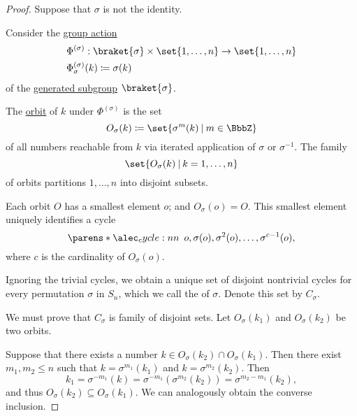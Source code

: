 \begin{proof}
  Suppose that \( \sigma \) is not the identity.

  Consider the \hyperref[def:group_action]{group action}
  \begin{equation*}
    \begin{aligned}
      &\Phi^{(\sigma)}: \braket{ \sigma } \times \set{ 1, \ldots, n } \to \set{ 1, \ldots, n } \\
      &\Phi^{(\sigma)}_\sigma(k) \coloneqq \sigma(k)
    \end{aligned}
  \end{equation*}
  of the \hyperref[def:first_order_generated_substructure]{generated subgroup} \( \braket{ \sigma } \).

  The \hyperref[def:group_action_orbit]{orbit} of \( k \) under \( \Phi^{(\sigma)} \) is the set
  \begin{equation*}
    O_\sigma(k) \coloneqq \set{ \sigma^m(k) \given m \in \BbbZ }
  \end{equation*}
  of all numbers reachable from \( k \) via iterated application of \( \sigma \) or \( \sigma^{-1} \). The family
  \begin{equation*}
    \set{ O_\sigma(k) \given k = 1, \ldots, n }
  \end{equation*}
  of orbits partitions \( 1, \ldots, n \) into disjoint subsets.

  Each orbit \( O \) has a smallest element \( o \); and \( O_\sigma(o) = O \). This smallest element uniquely identifies a cycle
  \begin{equation*}
    \cycle{o, \sigma(o), \sigma^2(o), \ldots, \sigma^{c-1}(o)},
  \end{equation*}
  where \( c \) is the cardinality of \( O_\sigma(o) \).

  Ignoring the trivial cycles, we obtain a unique set of disjoint nontrivial cycles for every permutation \( \sigma \) in \( S_n \), which we call the  of \( \sigma \). Denote this set by \( C_\sigma \).

  We must prove that \( C_\sigma \) is family of disjoint sets. Let \( O_\sigma(k_1) \) and \( O_\sigma(k_2) \) be two orbits.

  Suppose that there exists a number \( k \in O_\sigma(k_2) \cap O_\sigma(k_1) \). Then there exist \( m_1, m_2 \leq n \) such that \( k = \sigma^{m_1}(k_1) \) and \( k = \sigma^{m_2}(k_2) \). Then
  \begin{equation*}
    k_1 = \sigma^{-m_1}(k) = \sigma^{-m_1}(\sigma^{m_2}(k_2)) = \sigma^{m_2 - m_1}(k_2),
  \end{equation*}
  and thus \( O_\sigma(k_2) \subseteq O_\sigma(k_1) \). We can analogously obtain the converse inclusion.


\end{proof}
